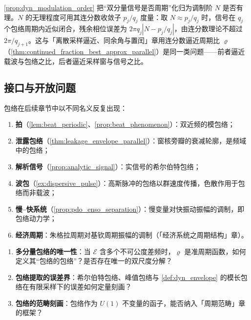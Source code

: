 \begin{remark}\label{rem:dyn_envelope_intercalation}
\cref{prop:dyn_modulation_order} 把“双分量信号是否周期”化归为调制阶 $N$ 是否有理。$N$ 的无理程度可用其连分数收敛子 $p_j/q_j$ 度量：取 $N\approx p_j/q_j$ 时，信号在 $q_j$ 个包络周期内近似闭合，残余相位误差为 $2\pi q_j|N-p_j/q_j|$，由连分数理论不超过 $2\pi/q_{j+1}$。这与「离散采样逼近、同余角与置闰」章用连分数逼近周期比 $\varrho$（\cref{thm:continued_fraction_best_approx_parallel}）是同一类问题——前者逼近载波与包络之比，后者逼近采样窗与信号之比。
\end{remark}

\subsection{接口与开放问题}

\begin{remark}[与其他章的接口]\label{rem:dyn_envelope_interfaces}
包络在后续章节中以不同名义反复出现：
\begin{enumerate}[label=(\roman*)]
    \item \textbf{拍}（\cref{lem:beat_periodic}、\cref{prop:beat_phenomenon}）：双近频的模包络；
    \item \textbf{泄露包络}（\cref{thm:leakage_envelope_parallel}）：窗核旁瓣的衰减轮廓，是频域中的包络；
    \item \textbf{解析信号}（\cref{prop:analytic_signal}）：实信号的希尔伯特包络；
    \item \textbf{波包}（\cref{ex:dispersive_pulse}）：高斯脉冲的包络以群速度传播，色散作用于包络而非载波；
    \item \textbf{慢–快系统}（\cref{prop:pdo_enso_separation}）：慢变量对快振动振幅的调制，即包络动力学；
    \item \textbf{经济周期}：朱格拉周期对基钦周期振幅的调制（「经济系统之周期结构」章）。
\end{enumerate}
\end{remark}

\begin{remark}[开放问题]\label{rem:dyn_envelope_open}
\begin{enumerate}[label=(\alph*)]
    \item \textbf{多分量包络的唯一性}：当 $\mathcal E$ 含多个不可公度差频时，$\varrho$ 是准周期函数，如何定义其“包络的包络”？是否存在唯一的双尺度分解？
    \item \textbf{包络提取的误差界}：希尔伯特包络、峰值包络与 \cref{def:dyn_envelope} 的模长包络在有限采样下的误差如何定量刻画？
    \item \textbf{包络的范畴刻画}：包络作为 $U(1)$ 不变量的函子，能否纳入「周期范畴」章的框架？
\end{enumerate}
\end{remark}

